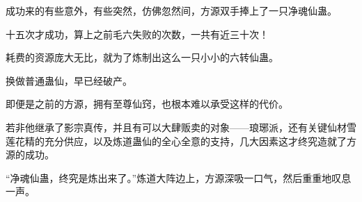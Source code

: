 \begin{this_body}
成功来的有些意外，有些突然，仿佛忽然间，方源双手捧上了一只净魂仙蛊。

十五次才成功，算上之前毛六失败的次数，一共有近三十次！

耗费的资源庞大无比，就为了炼制出这么一只小小的六转仙蛊。

换做普通蛊仙，早已经破产。

即便是之前的方源，拥有至尊仙窍，也根本难以承受这样的代价。

若非他继承了影宗真传，并且有可以大肆贩卖的对象——琅琊派，还有关键仙材雪莲花精的充分供应，以及炼道蛊仙的全心全意的支持，几大因素这才终究造就了方源的成功。

“净魂仙蛊，终究是炼出来了。”炼道大阵边上，方源深吸一口气，然后重重地叹息一声。

\end{this_body}

